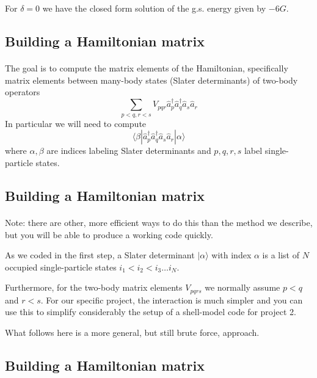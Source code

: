For $\delta = 0$ we have the closed form solution of  the g.s. energy given by $-6G$.



\subsection*{Building a Hamiltonian matrix}

\paragraph{}
The goal is to compute the matrix elements of the Hamiltonian, specifically
matrix elements between many-body states (Slater determinants) of two-body
operators
\[
\sum_{p < q, r < s}V_{pqr} \hat{a}^\dagger_p \hat{a}^\dagger_q\hat{a}_s \hat{a}_r
\]
In particular we will need to compute
\[
\langle \beta | \hat{a}^\dagger_p \hat{a}^\dagger_q\hat{a}_s \hat{a}_r |\alpha \rangle
\]
where $\alpha, \beta$ are indices labeling Slater determinants and $p,q,r,s$ label
single-particle states.



\subsection*{Building a Hamiltonian matrix}

\paragraph{}
Note: there are other, more efficient ways to do this than the method we describe, 
but you will
be able to produce a working code quickly.

As we coded in the first step,
a Slater determinant $| \alpha \rangle$ with index $\alpha$ is a
list of $N$ occupied single-particle states $i_1 < i_2 < i_3 \ldots i_N$.

Furthermore, for the two-body matrix elements $V_{pqrs}$ we normally assume
$p < q$ and $r < s$. For our specific project, the interaction is much simpler and you can use this to simplify considerably the setup of a shell-model code for project 2.

What follows here is a more general, but still brute force, approach.



\subsection*{Building a Hamiltonian matrix}


